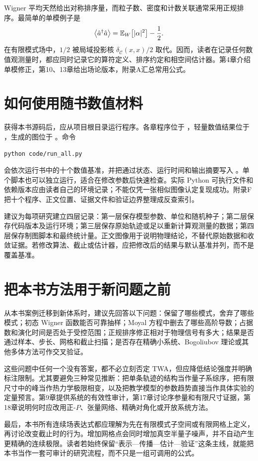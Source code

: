 Wigner 平均天然给出对称排序量，而粒子数、密度和计数关联通常采用正规排序。最简单的单模例子是
\begin{equation*}
  \left\langle \hat a^{\dagger}\hat a\right\rangle=\mathbb{E}_{W}\!\left[|\alpha|^2\right]-\frac12.
\end{equation*}
在有限模式场中，$1/2$ 被局域投影核 $\delta_{\mathcal C}(x,x)/2$ 取代。因而，读者在记录任何数值观测量时，都应同时记录它的算符定义、排序约定和相空间估计器。第4章介绍单模修正，第10、13章给出场论版本，附录A汇总常用公式。

\section*{如何使用随书数值材料}

获得本书源码后，应从项目根目录运行程序。各章程序位于 ，轻量数值结果位于 ，生成的图位于 。命令
\begin{lstlisting}[style=bookpython,numbers=none]
python code/run_all.py
\end{lstlisting}
会依次运行书中的十个数值基准，并把通过状态、运行时间和输出摘要写入 。单个脚本也可以独立运行，适合在修改参数后快速检查。实际 Python 可执行文件和依赖版本应由读者自己的环境记录；不能仅凭一张相似图像认定复现成功。附录F把十个程序、正文位置、证据文件和验证边界整理成反查索引。

建议为每项研究建立四层记录：第一层保存模型参数、单位和随机种子；第二层保存代码版本及运行环境；第三层保存原始轨迹或足以重新计算观测量的数据；第四层保存制图脚本和最终统计量。正文图像用于说明物理结论，不替代原始数据和收敛证据。若修改算法、截止或估计器，应把修改后的结果与默认基准并列，而不是覆盖基准。

\section*{把本书方法用于新问题之前}

从本书案例迁移到新体系时，建议先回答以下问题：保留了哪些模式，舍弃了哪些模式；初态 Wigner 函数能否可靠抽样；Moyal 方程中删去了哪些高阶导数；占据数和演化时间是否处于受控范围；正规排序修正相对于物理信号有多大；结果是否通过样本、步长、网格和截止扫描；是否存在精确小系统、Bogoliubov 理论或其他多体方法可作交叉验证。

这些问题中任何一个没有答案，都不必立刻否定 TWA，但应降低结论强度并明确标注限制。尤其要避免三种常见推断：把单条轨迹的结构当作量子系综序，把有限尺寸中的峰当作热力学极限相变，以及把教学模型的参数趋势直接当作具体实验的定量预言。第9章提供系统的有效性审计，第17章讨论序参量和有限尺寸证据，第18章说明何时应改用正-$P$、张量网络、精确对角化或开放系统方法。

最后，本书所有连续场表达式都应理解为先在有限模式子空间或有限网格上定义，再讨论改变截止时的行为。增加网格点会同时增加真空半量子噪声，并不自动产生更精确的连续极限。读者若始终保留“表示---传播---估计---验证”这条主线，就能把本书当作一套可审计的研究流程，而不只是一组可调用的公式。

